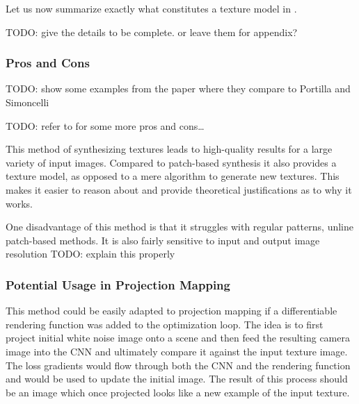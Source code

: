 Let us now summarize exactly what constitutes a texture model in \citet{Gatys2015}.

{\color{red} TODO: give the details to be complete. or leave them for appendix?}

\subsubsection{Pros and Cons}
\label{section:background-texture_synthesis-statistics_based-pros_and_cons}

{\color{red} TODO: show some examples from the paper where they compare to Portilla and Simoncelli}

{\color{red} TODO: refer to \citet{Raad2018} for some more pros and cons\dots}

This method of synthesizing textures leads to high-quality results for a large variety of input images. Compared to patch-based synthesis it also provides a texture model, as opposed to a mere algorithm to generate new textures. This makes it easier to reason about and provide theoretical justifications as to why it works.

One disadvantage of this method is that it struggles with regular patterns, unline patch-based methods. It is also fairly sensitive to input and output image resolution {\color{red} TODO: explain this properly}

\subsubsection{Potential Usage in Projection Mapping}
\label{section:background-texture_synthesis-statistics_based-projection_mapping}

This method could be easily adapted to projection mapping if a differentiable rendering function was added to the optimization loop. The idea is to first project initial white noise image onto a scene and then feed the resulting camera image into the CNN and ultimately compare it against the input texture image. The loss gradients would flow through both the CNN and the rendering function and would be used to update the initial image. The result of this process should be an image which once projected looks like a new example of the input texture.